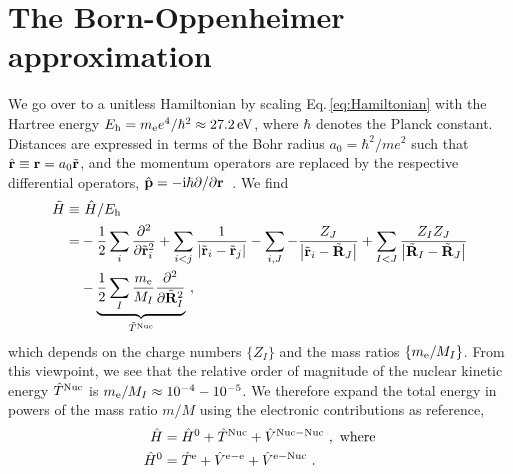 \section{The Born-Oppenheimer approximation}
We go over to a unitless Hamiltonian by scaling Eq.\,\eqref{eq:Hamiltonian} with the Hartree energy $E_{\rm h} = m_{\rm e} e^4 / \hbar^2 \approx 27.2\,{\rm eV}$, where $\hbar$ denotes the Planck constant. Distances are expressed in terms of the Bohr radius $a_0 = \hbar^2 / m e^2$ such that~$\hat{\bf r} \equiv {\bf r} = a_0 \tilde{\bf r}$, and the momentum operators are replaced by the respective differential operators, $\hat{\bf p}=-{\rm i} \hbar \partial / \partial {\bf r}$~\cite{Czycholl}. We find
\begin{align}
\begin{split}
    \tilde H 
        \equiv& ~\hat{H} / E_{\rm h} \\
        =& 
        - \frac{1}{2} \sum_i \frac{\partial^2}{\partial \tilde{\bf r}_i^2}
        + \sum_{i < j} \frac{1}{\left|\tilde{\b r}_{i}-\tilde{\bf r}_{j}\right|}
        - \sum_{i, J} -\frac{Z_J}{\left|\tilde{\b r}_{i}-\tilde{\bf R}_{J}\right|}
        + \sum_{I < J} \frac{Z_{I} Z_{J}}{
            \left|\tilde{\b R}_{I}-\tilde{\bf R}_{J}\right|} 
        \\
        &- \underset{\tilde{T}^{\rm Nuc}}{\underbrace{\frac{1}{2} \sum_I \frac{m_{\rm e}}{M_I} \frac{\partial^2}{\partial \tilde{\bf R}_I^2}}}~,
    \label{eq:Hscaled}
\end{split}
\end{align}
which depends on the charge numbers $\{Z_I\}$ and the mass ratios $\{ m_{\rm e} / M_I \}$. From this viewpoint, we see that the relative order of magnitude of the nuclear kinetic energy $\hat{T}^{\rm Nuc}$ is \mbox{$m_{\rm e} / M_I \approx 10^{-4} - 10^{-5}$}. 
We therefore expand the total energy in powers of the mass ratio $m/M$ using the electronic contributions as reference,
\begin{align}
    \hat{H}   &= \hat{H}^0 + \hat{T}^{\rm Nuc} + {\hat{V}}^{\mathrm{Nuc}-\mathrm{Nuc}}~, \text{ where} 
    \label{eq:H=H0+T}
    \\
    \hat{H}^0 &=
          {\hat{T}}^{\mathrm{e}}
        + {\hat{V}}^{\mathrm{e}-\mathrm{e}}
        + {\hat{V}}^{\mathrm{e}-\mathrm{Nuc}}~.
    \label{eq:H0}
\end{align}
